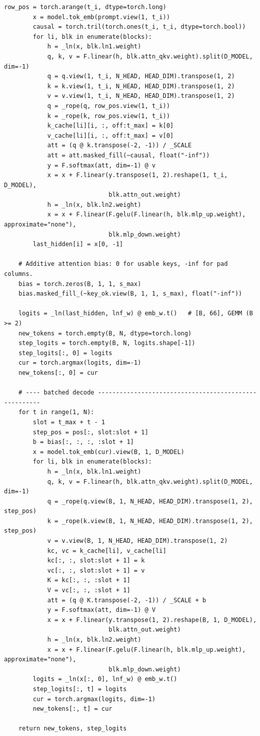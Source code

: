 \documentclass[11pt]{article}
\begin{document}
\begin{lstlisting}[style=py]
        row_pos = torch.arange(t_i, dtype=torch.long)
        x = model.tok_emb(prompt.view(1, t_i))
        causal = torch.tril(torch.ones(t_i, t_i, dtype=torch.bool))
        for li, blk in enumerate(blocks):
            h = _ln(x, blk.ln1.weight)
            q, k, v = F.linear(h, blk.attn_qkv.weight).split(D_MODEL, dim=-1)
            q = q.view(1, t_i, N_HEAD, HEAD_DIM).transpose(1, 2)
            k = k.view(1, t_i, N_HEAD, HEAD_DIM).transpose(1, 2)
            v = v.view(1, t_i, N_HEAD, HEAD_DIM).transpose(1, 2)
            q = _rope(q, row_pos.view(1, t_i))
            k = _rope(k, row_pos.view(1, t_i))
            k_cache[li][i, :, off:t_max] = k[0]
            v_cache[li][i, :, off:t_max] = v[0]
            att = (q @ k.transpose(-2, -1)) / _SCALE
            att = att.masked_fill(~causal, float("-inf"))
            y = F.softmax(att, dim=-1) @ v
            x = x + F.linear(y.transpose(1, 2).reshape(1, t_i, D_MODEL),
                             blk.attn_out.weight)
            h = _ln(x, blk.ln2.weight)
            x = x + F.linear(F.gelu(F.linear(h, blk.mlp_up.weight), approximate="none"),
                             blk.mlp_down.weight)
        last_hidden[i] = x[0, -1]

    # Additive attention bias: 0 for usable keys, -inf for pad columns.
    bias = torch.zeros(B, 1, 1, s_max)
    bias.masked_fill_(~key_ok.view(B, 1, 1, s_max), float("-inf"))

    logits = _ln(last_hidden, lnf_w) @ emb_w.t()   # [B, 66], GEMM (B >= 2)
    new_tokens = torch.empty(B, N, dtype=torch.long)
    step_logits = torch.empty(B, N, logits.shape[-1])
    step_logits[:, 0] = logits
    cur = torch.argmax(logits, dim=-1)
    new_tokens[:, 0] = cur

    # ---- batched decode ------------------------------------------------------
    for t in range(1, N):
        slot = t_max + t - 1
        step_pos = pos[:, slot:slot + 1]
        b = bias[:, :, :, :slot + 1]
        x = model.tok_emb(cur).view(B, 1, D_MODEL)
        for li, blk in enumerate(blocks):
            h = _ln(x, blk.ln1.weight)
            q, k, v = F.linear(h, blk.attn_qkv.weight).split(D_MODEL, dim=-1)
            q = _rope(q.view(B, 1, N_HEAD, HEAD_DIM).transpose(1, 2), step_pos)
            k = _rope(k.view(B, 1, N_HEAD, HEAD_DIM).transpose(1, 2), step_pos)
            v = v.view(B, 1, N_HEAD, HEAD_DIM).transpose(1, 2)
            kc, vc = k_cache[li], v_cache[li]
            kc[:, :, slot:slot + 1] = k
            vc[:, :, slot:slot + 1] = v
            K = kc[:, :, :slot + 1]
            V = vc[:, :, :slot + 1]
            att = (q @ K.transpose(-2, -1)) / _SCALE + b
            y = F.softmax(att, dim=-1) @ V
            x = x + F.linear(y.transpose(1, 2).reshape(B, 1, D_MODEL),
                             blk.attn_out.weight)
            h = _ln(x, blk.ln2.weight)
            x = x + F.linear(F.gelu(F.linear(h, blk.mlp_up.weight), approximate="none"),
                             blk.mlp_down.weight)
        logits = _ln(x[:, 0], lnf_w) @ emb_w.t()
        step_logits[:, t] = logits
        cur = torch.argmax(logits, dim=-1)
        new_tokens[:, t] = cur

    return new_tokens, step_logits
\end{lstlisting}
\end{document}
